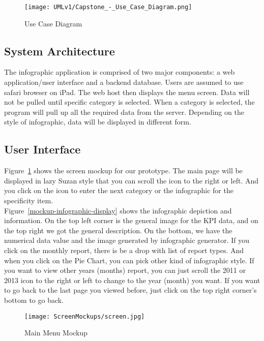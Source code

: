 \documentclass[11pt,a4paper,oneside]{article}
\begin{document}
\begin{figure}[!]
\caption{Use Case Diagram}
\texttt{[image: UMLv1/Capstone\_-\_Use\_Case\_Diagram.png]}\\   
\end{figure}


\subsection{System Architecture}

The infographic application is comprised of two major components: a web application/user interface and a backend database. Users are assumed to use safari browser on iPad. The web host then displays the menu screen. Data will not be pulled until specific category is selected. When a category is selected, the program will pull up all the required data from the server. Depending on the style of infographic, data will be displayed in different form.\\

\subsection{User Interface}

Figure~\ref{mockup-main-menu} shows the screen mockup for our prototype.   The main page will be displayed in lazy Suzan style that you can scroll the icon to the right or left.  And you click on the icon to enter the next category or the infographic for the specificity item.\\


Figure~\ref{mockup-infographic-display} shows the infographic depiction and information.  On the top left corner is the general image for the KPI data, and on the top right we got the general description.  On the bottom, we have the numerical data value and the image generated by infographic generator.  If you click on the monthly report, there is be a drop with list of report types.  And when you click on the Pie Chart, you can pick other kind of infographic style.  If you want to view other years (months) report, you can just scroll the 2011 or 2013 icon to the right or left to change to the year (month) you want.  If you want to go back to the last page you viewed before, just click on the top right corner’s bottom to go back.\\


\begin{figure}[!]
\caption{Main Menu Mockup\label{mockup-main-menu}}
\texttt{[image: ScreenMockups/screen.jpg]}\\
\end{figure}
\end{document}
